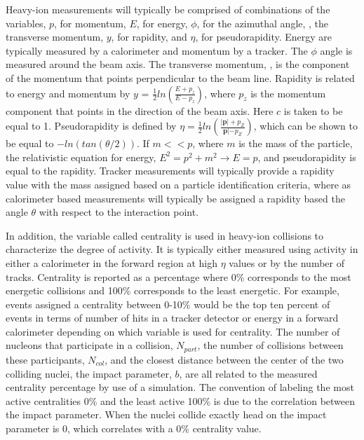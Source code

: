       Heavy-ion measurements will typically be comprised of 
        combinations of the variables, $p$, for momentum, $E$, for energy, 
        $\phi$, for the azimuthal angle, \pt, the transverse momentum, $y$, 
        for rapidity, and $\eta$, for pseudorapidity. 
      Energy are typically measured by a calorimeter and momentum by a tracker.
      The $\phi$ angle is measured around the beam axis. 
      The transverse momentum, \pt, is the component of the momentum that points
        perpendicular to the beam line. 
      Rapidity is related to energy and momentum by 
      $y$ = $\frac{1}{2}ln\left(\frac{E+p_{z}}{E-p_{z}}\right)$, where $p_{z}$ 
        is the momentum component that points in the direction of the beam axis. 
      Here $c$ is taken to be equal to 1. 
      Pseudorapidity is defined by
        $\eta=\frac{1}{2}ln\left(\frac{|\mathbf{p}|+p_{Z}}{\mathbf{p}|-p_{Z}}\right)$, 
        which can be shown to be equal to $-ln\left(tan\left(\theta/2\right)\right)$.
      If $m << p$, where $m$ is the mass of the particle, the 
        relativistic equation for energy, $E^2=p^2+m^2 \rightarrow E=p$, and 
        pseudorapidity is equal to the rapidity. 
      Tracker measurements will typically provide a rapidity value with 
        the mass assigned based on a particle identification criteria, where as 
        calorimeter based measurements will typically be assigned a rapidity 
        based the angle $\theta$ with respect to the interaction point.

      In addition, the variable called centrality is used in heavy-ion 
        collisions to characterize the degree of activity. 
      It is typically either measured using activity in either a calorimeter in
        the forward region at high $\eta$ values or by the number of tracks.
      Centrality is reported as a percentage where 0\% corresponds to the most 
        energetic collisions and 100\% corresponds to the least energetic.
      For example, events assigned a centrality between 0-10\% would be the 
        top ten percent of events in terms of number of hits in a tracker 
        detector or energy in a forward calorimeter depending on which 
        variable is used for centrality. 
      The number of nucleons that participate in a collision, $N_{part}$,
        the number of collisions between these participants, $N_{col}$, and the
        closest distance between the center of the two colliding nuclei, the 
        impact parameter, $b$, are all related to the measured centrality 
        percentage by use of a simulation. 
      The convention of labeling the most active centralities 0\% and the least
        active 100\% is due to the correlation between the impact parameter.
      When the nuclei collide exactly head on the impact parameter is 0, which 
        correlates with a 0\% centrality value. 

